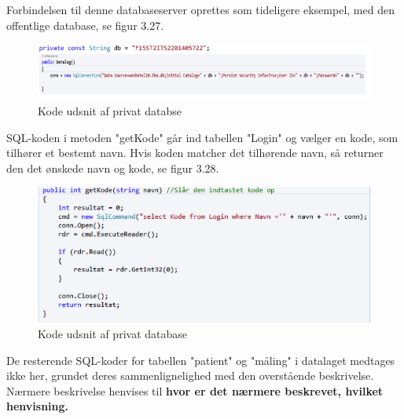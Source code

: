 Forbindelsen til denne databaseserver oprettes som tideligere eksempel, med den offentlige database, se figur 3.27.  

\begin{figure}[H]
	\centering
	\includegraphics[width=1\textwidth]{Figurer/Snip20150525_35}
	\caption{Kode udsnit af privat databse}	
\end{figure}

SQL-koden i metoden "getKode" går ind tabellen "Login" og vælger en kode, som tilhører et bestemt navn. Hvis koden matcher det tilhørende navn, så returner den det ønskede navn og kode, se figur 3.28.   

\begin{figure}[H]
	\centering
	\includegraphics[width=1\textwidth]{Figurer/Snip20150525_36}
	\caption{Kode udsnit af privat database}
\end{figure}

De resterende SQL-koder for tabellen "patient" og "måling" i datalaget medtages ikke her, grundet deres sammenlignelighed med den overstående beskrivelse. Nærmere beskrivelse henvises til \textbf{hvor er det nærmere beskrevet, hvilket henvisning.} 









